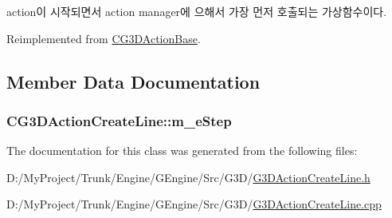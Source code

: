 \begin{DoxyItemize}
\item action이 시작되면서 action manager에 으해서 가장 먼저 호출되는 가상함수이다. 
\end{DoxyItemize}

Reimplemented from \hyperlink{class_c_g3_d_action_base_afaa3c0d456deadd08cad7e7ea4444a1e}{C\+G3\+D\+Action\+Base}.



\subsection{Member Data Documentation}
\hypertarget{class_c_g3_d_action_create_line_a9016c274e361d0c161ac2d797c94b966}{}
\subsubsection[{m\+\_\+e\+Step}]{ C\+G3\+D\+Action\+Create\+Line\+::m\+\_\+e\+Step\hspace{0.3cm}{\ttfamily [protected]}}\label{class_c_g3_d_action_create_line_a9016c274e361d0c161ac2d797c94b966}


The documentation for this class was generated from the following files\+:\begin{DoxyCompactItemize}
\item 
D\+:/\+My\+Project/\+Trunk/\+Engine/\+G\+Engine/\+Src/\+G3\+D/\hyperlink{_g3_d_action_create_line_8h}{G3\+D\+Action\+Create\+Line.\+h}\item 
D\+:/\+My\+Project/\+Trunk/\+Engine/\+G\+Engine/\+Src/\+G3\+D/\hyperlink{_g3_d_action_create_line_8cpp}{G3\+D\+Action\+Create\+Line.\+cpp}\end{DoxyCompactItemize}
